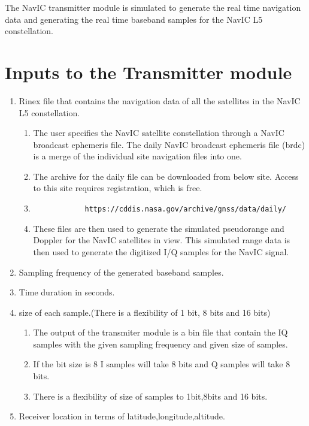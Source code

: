 The NavIC transmitter module is simulated to generate the real time navigation data and generating the real time baseband samples for the NavIC L5 constellation.


\section{Inputs to the Transmitter module}
\begin{enumerate}
	\item Rinex file that contains the navigation data of all the satellites in the NavIC L5 constellation.
	\begin{enumerate}
		\item The user specifies the NavIC satellite constellation through a NavIC broadcast ephemeris file. The daily NavIC broadcast ephemeris file (brdc) is a merge of the individual site navigation files into one. 
		\item The archive for the daily file can be downloaded from below site. Access to this site requires registration, which is free. 
		\item[] \begin{lstlisting}
			https://cddis.nasa.gov/archive/gnss/data/daily/
		\end{lstlisting}
		\item These files are then used to generate the simulated pseudorange and Doppler for the NavIC satellites in view. This simulated range data is then used to generate the digitized I/Q samples for the NavIC signal.
	\end{enumerate}
	\item Sampling frequency of the generated baseband samples.
	\item Time duration in seconds.
	\item size of each sample.(There is a flexibility of 1 bit, 8 bits and 16 bits)
	\begin{enumerate}
		\item The output of the transmiter module is a bin file that contain the IQ samples with the given sampling frequency and given size of samples.
		\item If the bit size is 8 I samples will take 8 bits and Q samples will take 8 bits.
		\item There is a flexibility of size of samples to 1bit,8bits and 16 bits.
	\end{enumerate}
	\item Receiver location in terms of latitude,longitude,altitude.
\end{enumerate}


